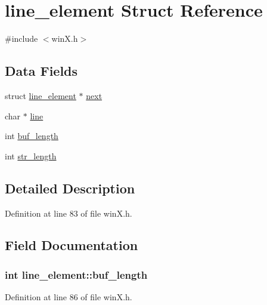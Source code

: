 \hypertarget{structline__element}{\section{line\+\_\+element Struct Reference}
\label{structline__element}
}


{\ttfamily \#include $<$win\+X.\+h$>$}

\subsection*{Data Fields}
\begin{DoxyCompactItemize}
\item 
struct \hyperlink{structline__element}{line\+\_\+element} $\ast$ \hyperlink{structline__element_a1cdd40d4dd6f8b3fe87bd77df90afbaf}{next}
\item 
char $\ast$ \hyperlink{structline__element_a684c95e23c7d50d2f2152c82c137d66b}{line}
\item 
int \hyperlink{structline__element_a57475a80631202b2a3400477c182308d}{buf\+\_\+length}
\item 
int \hyperlink{structline__element_a6d24c9bca6243e9975bb8150ab0865e5}{str\+\_\+length}
\end{DoxyCompactItemize}


\subsection{Detailed Description}


Definition at line 83 of file win\+X.\+h.



\subsection{Field Documentation}
\hypertarget{structline__element_a57475a80631202b2a3400477c182308d}{
\subsubsection[{buf\+\_\+length}]{\setlength{\rightskip}{0pt plus 5cm}int line\+\_\+element\+::buf\+\_\+length}}\label{structline__element_a57475a80631202b2a3400477c182308d}


Definition at line 86 of file win\+X.\+h.



